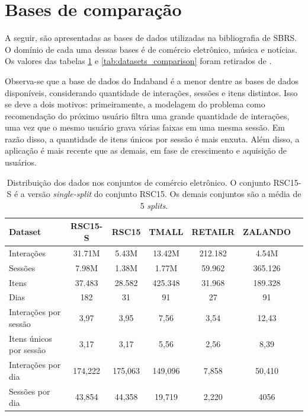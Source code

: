  \section{Bases de comparação}
 A seguir, são apresentadas as bases de dados utilizadas na bibliografia de
  SBRS. O domínio de cada uma dessas bases é de comércio eletrônico, música e
  notícias. Os valores das tabelas \ref{tab:datasets} e
  \ref{tab:datasets_comparison} foram retirados de \citet{ludewig_2018}.

  Observa-se que a base de dados do Indaband é a menor dentre as bases
  de dados disponíveis, considerando quantidade de interações, sessões e itens
  distintos. Isso se deve a dois motivos: primeiramente, a modelagem do problema
  como recomendação do próximo usuário filtra uma grande quantidade de
  interações, uma vez que o mesmo usuário grava várias faixas em uma mesma
  sessão. Em razão disso, a quantidade de itens únicos por sessão é mais enxuta.
  Além disso, a aplicação é mais recente que as demais, em fase de crescimento e
  aquisição de usuários.

  \begin{table}[htbp]
    \centering
    \begin{tabular}{lcccccc}
        \toprule
        \textbf{Dataset} & \textbf{RSC15-S} & \textbf{RSC15} & \textbf{TMALL} & \textbf{RETAILR} & \textbf{ZALANDO} \\
        \midrule
        Interações & 31.71M & 5.43M & 13.42M & 212.182 & 4.54M \\
        Sessões & 7.98M & 1.38M & 1.77M & 59.962 & 365.126 \\
        Itens & 37.483 & 28.582 & 425.348 & 31.968 & 189.328 \\
        Dias & 182 & 31 & 91 & 27 & 91 \\
        \hline
        Interações por sessão & 3,97 & 3,95 & 7,56 & 3,54 & 12,43 \\ 
        Itens únicos por sessão & 3,17 & 3,17 & 5,56 & 2,56 & 8,39 \\ 
        Interações por dia & 174,222 & 175,063 & 149,096 & 7,858 & 50,410 \\
        Sessões por dia & 43,854 & 44,358 & 19,719 & 2,220 & 4056 \\ 
        \bottomrule
    \end{tabular}
    \caption{Distribuição dos dados nos conjuntos de comércio eletrônico. O
    conjunto RSC15-S é a versão \textit{single-split} do conjunto RSC15. Os demais
    conjuntos são a média de 5 \textit{splits}. }
    \label{tab:datasets}
  \end{table}
  
